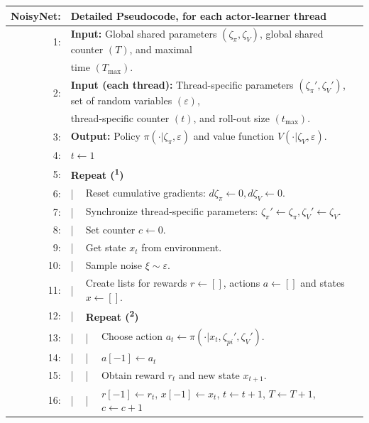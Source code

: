\begin{table}[H]
  \centering
  \begin{tabular}{rlll}
    \hline\hline
    \textbf{NoisyNet:} & \multicolumn{3}{l}{Detailed Pseudocode, for each actor-learner thread}\\
    \hline
    1: & \multicolumn{3}{l}{\textbf{Input:} Global shared parameters $(\zeta_{\pi}, \zeta_{V})$, global shared counter $(T)$, and maximal}\\
    & \multicolumn{3}{l}{time $(T_{\text{max}})$.}\\
    2: & \multicolumn{3}{l}{\textbf{Input (each thread):} Thread-specific parameters $(\zeta_{\pi}', \zeta_{V}')$, set of random variables $(\varepsilon)$,}\\
    & \multicolumn{3}{l}{thread-specific counter $(t)$, and roll-out size $(t_{\text{max}})$.}\\
    3: & \multicolumn{3}{l}{\textbf{Output:} Policy $\pi(\cdot|\zeta_{\pi}, \varepsilon)$ and value function $V(\cdot|\zeta_{V},\varepsilon)$.}\\
    4: & \multicolumn{3}{l}{$t \leftarrow 1$}\\
    5: & \multicolumn{3}{l}{\textbf{Repeat (\textsuperscript{1})}}\\
    6: & | & \multicolumn{2}{l}{Reset cumulative gradients: $d\zeta_{\pi} \leftarrow 0, d\zeta_{V} \leftarrow 0$.}\\
    7: & | & \multicolumn{2}{l}{Synchronize thread-specific parameters: $\zeta_{\pi}' \leftarrow \zeta_{\pi}, \zeta_{V}' \leftarrow \zeta_{V}$.}\\
    8: & | & \multicolumn{2}{l}{Set counter $c \leftarrow 0$.}\\
    9: & | & \multicolumn{2}{l}{Get state $x_{t}$ from environment.}\\
    10: & | & \multicolumn{2}{l}{Sample noise $\xi \sim \varepsilon$.}\\
    11: & | & \multicolumn{2}{l}{Create lists for rewards $r \leftarrow [ ]$, actions $a \leftarrow [ ]$ and states $x \leftarrow [ ]$.}\\
    12: & | & \multicolumn{2}{l}{\textbf{Repeat (\textsuperscript{2})}}\\
    13: & | & | & Choose action $a_{t} \leftarrow \pi(\cdot|x_{t}, \zeta_{pi}', \zeta_{V}')$.\\
    14: & | & | & $a[-1] \leftarrow a_{t}$\\
    15: & | & | & Obtain reward $r_{t}$ and new state $x_{t+1}$.\\
    16: & | & | & $r[-1] \leftarrow r_{t}$, $x[-1] \leftarrow x_{t}$, $t \leftarrow t + 1$, $T \leftarrow T + 1$, $c \leftarrow c + 1$\\

\end{tabular}
\end{table}
